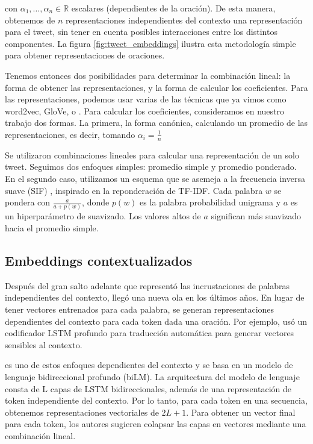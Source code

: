 con $\alpha_1, \ldots, \alpha_n \in \mathbb{R}$ escalares (dependientes de la oración). De esta manera, obtenemos de $n$ representaciones independientes del contexto una representación para el tweet, sin tener en cuenta posibles interacciones entre los distintos componentes. La figura \ref{fig:tweet_embeddings} ilustra esta metodología simple para obtener representaciones de oraciones.

Tenemos entonces dos posibilidades para determinar la combinación lineal: la forma de obtener las representaciones, y la forma de calcular los coeficientes. Para las representaciones, podemos usar varias de las técnicas que ya vimos como word2vec, GloVe, o \fasttext{}. Para calcular los coeficientes, consideramos en nuestro trabajo dos formas. La primera, la forma canónica, calculando un promedio de las representaciones, es decir, tomando $\alpha_i = \frac{1}{n}$

Se utilizaron combinaciones lineales para calcular una representación de un solo tweet.
Seguimos dos enfoques simples: promedio simple y promedio ponderado. En el segundo caso, utilizamos un esquema que se asemeja a la frecuencia inversa suave (SIF) \cite {arora17}, inspirado en la reponderación de TF-IDF.
Cada palabra $ w $ se pondera con $ \frac {a} {a + p (w)} $, donde $ p (w) $ es la palabra probabilidad unigrama y $ a $ es un hiperparámetro de suavizado.
Los valores altos de $ a $ significan más suavizado hacia el promedio simple.



\subsection{Embeddings contextualizados}
\label{subsec:elmo}

Después del gran salto adelante que representó las incrustaciones de palabras independientes del contexto, llegó una nueva ola en los últimos años. En lugar de tener vectores entrenados para cada palabra, se generan representaciones dependientes del contexto para cada token dada una oración. Por ejemplo, \citet{mccann2017learned} usó un codificador LSTM profundo para traducción automática para generar vectores sensibles al contexto.

\elmo{} \cite{peters2018} es uno de estos enfoques dependientes del contexto y se basa en un modelo de lenguaje bidireccional profundo (biLM). La arquitectura del modelo de lenguaje consta de L capas de LSTM bidireccionales, además de una representación de token independiente del contexto. Por lo tanto, para cada token en una secuencia, obtenemos representaciones vectoriales de $ 2L + 1 $.
Para obtener un vector final para cada token, los autores sugieren colapsar las capas en vectores mediante una combinación lineal.

